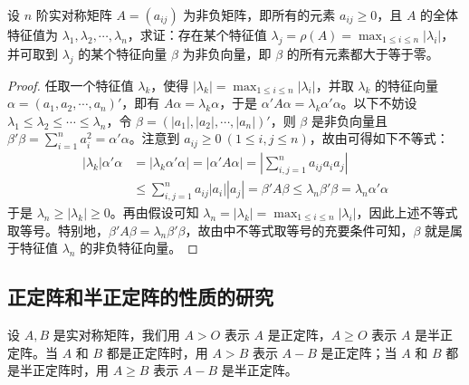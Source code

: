 \documentclass[../../main.tex]{subfiles}
\begin{document}
\begin{proposition}\label{proposition:例9.58}
设 \(n\) 阶实对称矩阵 \(A = (a_{ij})\) 为非负矩阵，即所有的元素 \(a_{ij} \geq 0\)，且 \(A\) 的全体特征值为 \(\lambda_1,\lambda_2,\cdots,\lambda_n\)，求证：存在某个特征值 \(\lambda_j = \rho(A) = \max_{1\leq i \leq n}|\lambda_i|\)，并可取到 \(\lambda_j\) 的某个特征向量 \(\beta\) 为非负向量，即 \(\beta\) 的所有元素都大于等于零。
\end{proposition}
\begin{proof}
任取一个特征值 \(\lambda_k\)，使得 \(|\lambda_k| = \max_{1\leq i \leq n}|\lambda_i|\)，并取 \(\lambda_k\) 的特征向量 \(\alpha = (a_1,a_2,\cdots,a_n)'\)，即有 \(A\alpha = \lambda_k\alpha\)，于是 \(\alpha'A\alpha = \lambda_k\alpha'\alpha\)。以下不妨设 \(\lambda_1 \leq \lambda_2 \leq \cdots \leq \lambda_n\)，令 \(\beta = (|a_1|,|a_2|,\cdots,|a_n|)'\)，则 \(\beta\) 是非负向量且 \(\beta'\beta = \sum_{i = 1}^{n}a_i^2 = \alpha'\alpha\)。注意到 \(a_{ij} \geq 0\ (1\leq i,j \leq n)\)，故由可得如下不等式：
\begin{align*}
|\lambda_k|\alpha'\alpha &= |\lambda_k\alpha'\alpha| = |\alpha'A\alpha| = \left|\sum_{i,j = 1}^{n}a_{ij}a_ia_j\right|\\
&\leq \sum_{i,j = 1}^{n}a_{ij}|a_i||a_j| = \beta'A\beta \leq \lambda_n\beta'\beta = \lambda_n\alpha'\alpha
\end{align*}
于是 \(\lambda_n \geq |\lambda_k| \geq 0\)。再由假设可知 \(\lambda_n = |\lambda_k| = \max_{1\leq i \leq n}|\lambda_i|\)，因此上述不等式取等号。特别地，\(\beta'A\beta = \lambda_n\beta'\beta\)，故由中不等式取等号的充要条件可知，\(\beta\) 就是属于特征值 \(\lambda_n\) 的非负特征向量。 
\end{proof}


\subsection{正定阵和半正定阵的性质的研究}

\begin{definition}[正定阵和半正定阵的记号]
设 \(A,B\) 是实对称矩阵，我们用 \(A > O\) 表示 \(A\) 是正定阵，\(A \geq O\) 表示 \(A\) 是半正定阵。当 \(A\) 和 \(B\) 都是正定阵时，用 \(A > B\) 表示 \(A - B\) 是正定阵；当 \(A\) 和 \(B\) 都是半正定阵时，用 \(A \geq B\) 表示 \(A - B\) 是半正定阵。 
\end{definition}
\end{document}
